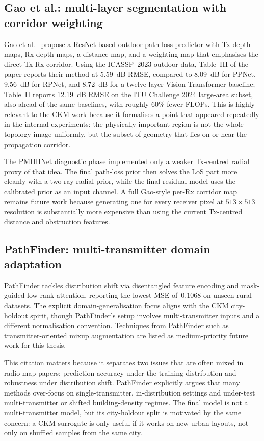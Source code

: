\subsection{Gao et al.: multi-layer segmentation with corridor weighting}

Gao et al.\ \cite{gao2026} propose a ResNet-based outdoor path-loss predictor
with Tx depth maps, Rx depth maps, a distance map, and a weighting map that
emphasises the direct Tx-Rx corridor.  Using the ICASSP~2023 outdoor data,
Table~III of the paper reports their method at \SI{5.59}{dB} RMSE, compared
to \SI{8.09}{dB} for PPNet, \SI{9.56}{dB} for RPNet, and \SI{8.72}{dB} for a
twelve-layer Vision Transformer baseline; Table~II reports \SI{12.19}{dB}
RMSE on the ITU Challenge 2024 large-area subset, also ahead of the same
baselines, with roughly 60\% fewer FLOPs.  This is highly relevant to the
CKM work because it formalises a point
that appeared repeatedly in the internal experiments: the physically important region
is not the whole topology image uniformly, but the subset of geometry that lies
on or near the propagation corridor.

The PMHHNet diagnostic phase implemented only a weaker Tx-centred radial proxy of that
idea. The final path-loss prior then solves the LoS part more cleanly with a two-ray radial prior,
while the final residual model uses the calibrated prior as an input channel. A full Gao-style
per-Rx corridor map remains future work because generating one for every
receiver pixel at \(513\times513\) resolution is substantially more expensive
than using the current Tx-centred distance and obstruction features.

\subsection{PathFinder: multi-transmitter domain adaptation}

PathFinder \cite{pathfinder2025} tackles distribution shift via disentangled
feature encoding and mask-guided low-rank attention, reporting the lowest MSE
of~$0.1068$ on unseen rural datasets.  The explicit domain-generalisation focus
aligns with the CKM city-holdout spirit, though PathFinder's setup involves
multi-transmitter inputs and a different normalisation convention.  Techniques
from PathFinder such as transmitter-oriented mixup augmentation are listed as
medium-priority future work for this thesis.

This citation matters because it separates two issues that are often mixed in
radio-map papers: prediction accuracy under the training distribution and
robustness under distribution shift.  PathFinder explicitly argues that many
methods over-focus on single-transmitter, in-distribution settings and
under-test multi-transmitter or shifted building-density regimes. The final model is
not a multi-transmitter model, but its city-holdout split is motivated by the
same concern: a CKM surrogate is only useful if it works on new urban layouts,
not only on shuffled samples from the same city.

